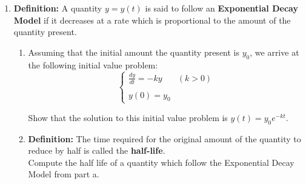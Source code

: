 \documentclass[12pt]{article}
\newif\ifans
\begin{document}
\begin{enumerate}
\begin{enumerate}
\end{enumerate}

\item {\bf Definition:} A quantity $y=y(t)$ is said to follow an {\bf Exponential Decay Model} if it decreases at a rate which is proportional to the amount of the quantity present.

\begin{enumerate}

\item Assuming that the initial amount the quantity present is $y_0$, we arrive at the following initial value problem: $$\left\{\begin{array}{ll} \frac{dy}{dt}=-ky & (k>0)\\
 & \\
y(0)=y_0& \end{array}\right.$$

Show that the solution to this initial value problem is $y(t)=y_0e^{-kt}$.

\item {\bf Definition:} The time required for the original amount of the quantity to reduce by half is called the {\bf half-life}.\\

Compute the half life of a quantity which follow the Exponential Decay Model from part a.

\ifans{\fbox{$t_{1/2}=\frac{\ln{2}}{k}$}} \fi

\end{enumerate}

\end{enumerate}

\newpage

\end{document}
